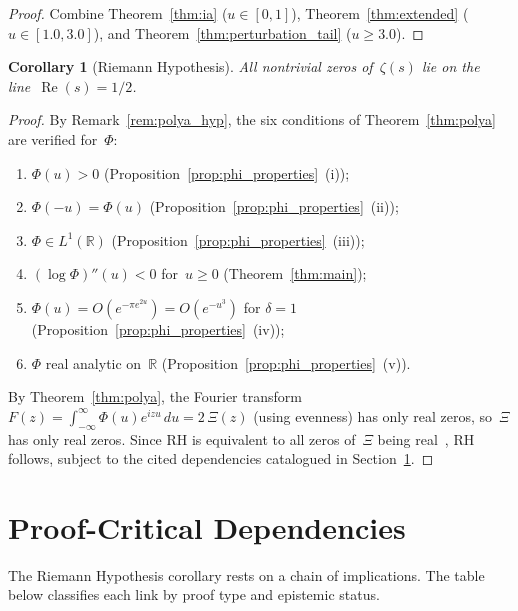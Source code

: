 \documentclass[11pt]{article}
\newtheorem{corollary}[theorem]{Corollary}
\theoremstyle{definition}
\theoremstyle{remark}
\begin{document}
\begin{proof}
Combine Theorem~\ref{thm:ia} ($u \in [0,1]$), Theorem~\ref{thm:extended} ($u \in [1.0, 3.0]$), and Theorem~\ref{thm:perturbation_tail} ($u \geq 3.0$).
\end{proof}

\begin{corollary}[Riemann Hypothesis]\label{thm:rh}
All nontrivial zeros of~$\zeta(s)$ lie on the line~$\operatorname{Re}(s) = 1/2$.
\end{corollary}

\begin{proof}
By Remark~\ref{rem:polya_hyp}, the six conditions of Theorem~\ref{thm:polya} are verified for~$\Phi$:
\begin{enumerate}[label=(\roman*)]
\item $\Phi(u) > 0$ \hfill (Proposition~\ref{prop:phi_properties}~(i));
\item $\Phi(-u) = \Phi(u)$ \hfill (Proposition~\ref{prop:phi_properties}~(ii));
\item $\Phi \in L^1(\mathbb{R})$ \hfill (Proposition~\ref{prop:phi_properties}~(iii));
\item $(\log\Phi)''(u) < 0$ for~$u \geq 0$ \hfill (Theorem~\ref{thm:main});
\item $\Phi(u) = O(e^{-\pi e^{2u}}) = O(e^{-u^3})$ for $\delta = 1$ \hfill (Proposition~\ref{prop:phi_properties}~(iv));
\item $\Phi$ real analytic on~$\mathbb{R}$ \hfill (Proposition~\ref{prop:phi_properties}~(v)).
\end{enumerate}
By Theorem~\ref{thm:polya}, the Fourier transform $F(z) = \int_{-\infty}^{\infty}\Phi(u)e^{izu}\,du = 2\,\Xi(z)$
(using evenness) has only real zeros, so~$\Xi$ has only real zeros.
Since RH is equivalent to all zeros of~$\Xi$ being real~\cite{titchmarsh1986}, RH follows,
subject to the cited dependencies catalogued in Section~\ref{sec:deps}.
\end{proof}

\section{Proof-Critical Dependencies}\label{sec:deps}

The Riemann Hypothesis corollary rests on a chain of implications. The table below
classifies each link by proof type and epistemic status.
\medskip
\end{document}
